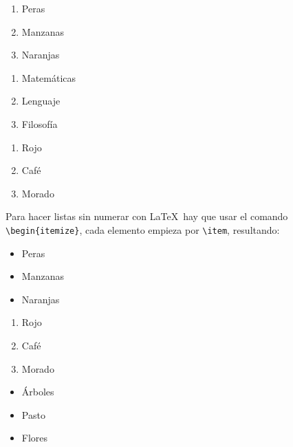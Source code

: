 		\begin{multicols}{3}
			\begin{enumerate}[label=\alph*) ,font=\bfseries] %
				\item Peras
				\item Manzanas
				\item Naranjas
			\end{enumerate}
			
			\begin{enumerate}[label=\greek*) ]
				\item Matemáticas
				\item Lenguaje
				\item Filosofía
			\end{enumerate}
		
			\begin{enumerate}[label=\roman*) ]
				\item Rojo
				\item Café
				\item Morado
			\end{enumerate}
		\end{multicols}
		
		Para hacer listas sin numerar con \LaTeX\ hay que usar el comando \texttt{\textbackslash begin\{itemize\}}, cada elemento empieza por \texttt{\textbackslash item}, resultando:
		
		\begin{multicols}{3}
			\begin{itemize}[label={--}]
				\item Peras
				\item Manzanas
				\item Naranjas
			\end{itemize}
			
			\begin{enumerate}[label={*}]
				\item Rojo
				\item Café
				\item Morado
			\end{enumerate}
			
			\begin{itemize}
				\item Árboles
				\item Pasto
				\item Flores
			\end{itemize}
		\end{multicols}
		
